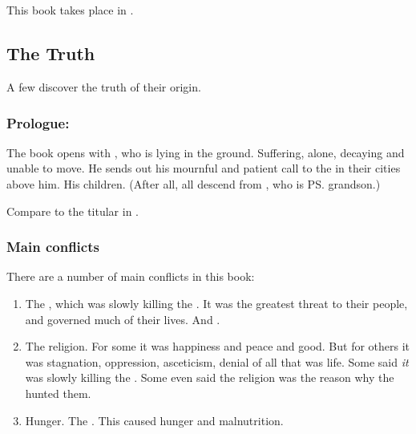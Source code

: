 \chapter{\MerkyrahBook}
This book takes place in . 















\section{The Truth}
A few \resphain{} discover the truth of their origin.









\subsection{Prologue: \Semiza}
The book opens with \Semiza, who is lying in the ground. 
Suffering, alone, decaying and unable to move. 
He sends out his mournful and patient call to the \resphain{} in their cities above him. 
His children. 
(After all, all \resphain{} descend from \Thanatzil, who is \ps{\Semiza}{} grandson.)

Compare to the titular  in . 









\subsection{Main conflicts}
There are a number of main conflicts in this book: 

\begin{enumerate}
  \item 
    The , which was slowly killing the \resphain. 
    It was the greatest threat to their people, and governed much of their lives. 
    And . 
  \item 
    The \Merkyran{} religion.
    For some it was happiness and peace and good. 
    But for others it was stagnation, oppression, asceticism, denial of all that was life. 
    Some said \emph{it} was slowly killing the \resphain.
    Some even said the religion was the reason why the \umbrae{} hunted them. 
  \item 
    Hunger. 
    The . 
    This caused hunger and malnutrition. 
\end{enumerate}





